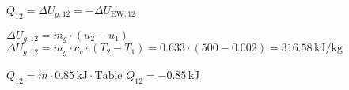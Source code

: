 \( Q_{12} = \Delta U_{g,12} = -\Delta U_{\text{EW},12} \)  

\( \Delta U_{g,12} = m_g \cdot (u_2 - u_1) \)  
\( \Delta U_{g,12} = m_g \cdot c_v \cdot (T_2 - T_1) = 0.633 \cdot (500 - 0.002) = 316.58 \, \text{kJ/kg} \)  

\( Q_{12} = m \cdot 0.85 \, \text{kJ} \cdot \text{Table} \)  
\( Q_{12} = -0.85 \, \text{kJ} \)